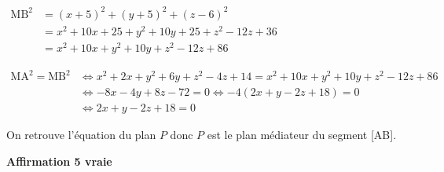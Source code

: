 \begin{enumerate}
$\begin{aligned}
\text{MB}^2 
& = (x+5)^2+(y+5)^2+ (z-6)^2\\
& = x^2+10x+25 + y^2+10y +25 +z^2-12z+36\\
& = x^2+10x + y^2+10y+z^2-12z+86
\end{aligned}$

$\begin{aligned}
\text{MA}^2 = \text{MB}^2
& \iff x^2+2x + y^2+6y+z^2-4z+14 = x^2+10x + y^2+10y+z^2-12z+86\\
& \iff -8x -4y + 8z -72=0
\iff -4\left ( 2x +y -2z +18\right ) = 0\\
& \iff 2x+y-2z  +18 = 0
\end{aligned}$

On retrouve l'équation du plan $P$ donc $P$ est le plan médiateur du segment [AB].

\hfill\textbf{Affirmation 5 vraie}
	\end{enumerate}
